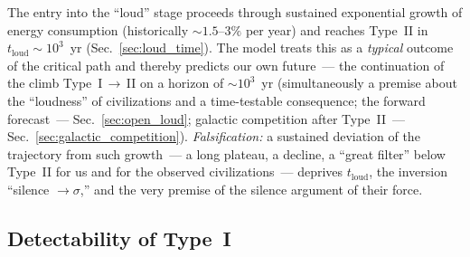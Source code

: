 \documentclass[11pt,a4paper]{article}
\begin{document}
The entry into the ``loud'' stage proceeds through sustained exponential growth of energy consumption (historically $\sim 1.5$--$3\%$ per year) and reaches Type~II in $t_{\mathrm{loud}} \sim 10^3$~yr (Sec.~\ref{sec:loud_time}). The model treats this as a \emph{typical} outcome of the critical path and thereby predicts our own future~--- the continuation of the climb Type~I\,$\to$\,II on a horizon of $\sim 10^3$~yr (simultaneously a premise about the ``loudness'' of civilizations and a time-testable consequence; the forward forecast~--- Sec.~\ref{sec:open_loud}; galactic competition after Type~II~--- Sec.~\ref{sec:galactic_competition}). \emph{Falsification:} a sustained deviation of the trajectory from such growth~--- a long plateau, a decline, a ``great filter'' below Type~II for us and for the observed civilizations~--- deprives $t_{\mathrm{loud}}$, the inversion ``silence $\to \sigma$,'' and the very premise of the silence argument of their force.

\subsection{Detectability of Type~I}
\label{sec:pred_type1}
\end{document}
